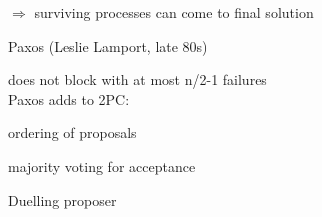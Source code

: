 \begin{compactitem}
\begin{compactitem}
		$\Rightarrow$ surviving processes can come to final solution
	\end{compactitem}
	\item Paxos (Leslie Lamport, late 80s)
	\begin{compactitem}
		\item does not block with at most n/2-1 failures\\
		Paxos adds to 2PC:
		\begin{compactitem}
			\item ordering of proposals
			\item majority voting for acceptance
		\end{compactitem}
		Duelling proposer
	\end{compactitem}
\end{compactitem}


